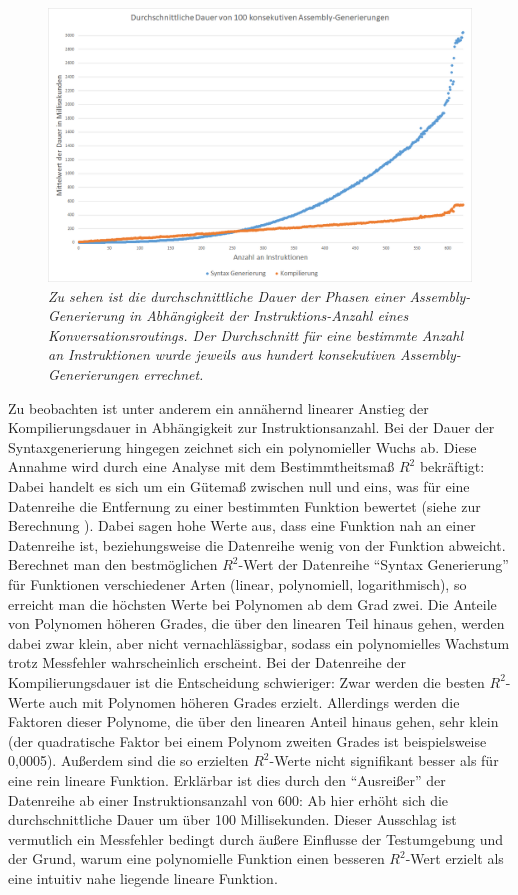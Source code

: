\begin{figure} %
	\centering
		\includegraphics[width=\textwidth]{img/AverageTimeDiagram2.png}
	\caption[Durchschnittliche Dauer von Assembly-Generierungen]{\textit{Zu sehen ist die durchschnittliche Dauer der Phasen einer Assembly-Generierung in Abhängigkeit der Instruktions-Anzahl eines Konversationsroutings. Der Durchschnitt für eine bestimmte Anzahl an Instruktionen wurde jeweils aus hundert konsekutiven Assembly-Generierungen errechnet.}}
	\label{fig:AverageTimeDiagram}
\end{figure}
Zu beobachten ist unter anderem ein annähernd linearer Anstieg der Kompilierungsdauer in Abhängigkeit zur Instruktionsanzahl. Bei der Dauer der Syntaxgenerierung hingegen zeichnet sich ein polynomieller Wuchs ab. Diese Annahme wird durch eine Analyse mit dem Bestimmtheitsmaß $R^{2}$ bekräftigt: Dabei handelt es sich um ein Gütemaß zwischen null und eins, was für eine Datenreihe die Entfernung zu einer bestimmten Funktion bewertet (siehe zur Berechnung \cite{Pflieger:14}). Dabei sagen hohe Werte aus, dass eine Funktion nah an einer Datenreihe ist, beziehungsweise die Datenreihe wenig von der Funktion abweicht. Berechnet man den bestmöglichen $R^{2}$-Wert der Datenreihe ``Syntax Generierung'' für Funktionen verschiedener Arten (linear, polynomiell, logarithmisch), so erreicht man die höchsten Werte bei Polynomen ab dem Grad zwei. Die Anteile von Polynomen höheren Grades, die über den linearen Teil hinaus gehen, werden dabei zwar klein, aber nicht vernachlässigbar, sodass ein polynomielles Wachstum trotz Messfehler wahrscheinlich erscheint. 
\newline
Bei der Datenreihe der Kompilierungsdauer ist die Entscheidung schwieriger: Zwar werden die besten $R^{2}$-Werte auch mit Polynomen höheren Grades erzielt. Allerdings werden die Faktoren dieser Polynome, die über den linearen Anteil hinaus gehen, sehr klein (der quadratische Faktor bei einem Polynom zweiten Grades ist beispielsweise 0,0005). Außerdem sind die so erzielten $R^{2}$-Werte nicht signifikant besser als für eine rein lineare Funktion. Erklärbar ist dies durch den ``Ausreißer'' der Datenreihe ab einer Instruktionsanzahl von 600: Ab hier erhöht sich die durchschnittliche Dauer um über 100 Millisekunden. Dieser Ausschlag ist vermutlich ein Messfehler bedingt durch äußere Einflusse der Testumgebung und der Grund, warum eine polynomielle Funktion einen besseren $R^{2}$-Wert erzielt als eine intuitiv nahe liegende lineare Funktion.
